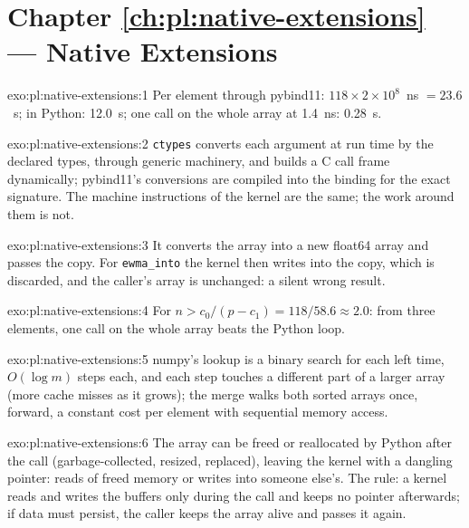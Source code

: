 \section*{Chapter \ref{ch:pl:native-extensions} --- Native Extensions}

\begin{solution}{exo:pl:native-extensions:1}
Per element through pybind11: $118 \times 2\times10^8$~ns $= 23.6$~s; in Python: 12.0~s; one call on the whole array at 1.4~ns: 0.28~s.
\end{solution}

\begin{solution}{exo:pl:native-extensions:2}
\texttt{ctypes} converts each argument at run time by the declared types, through generic machinery, and builds a C call frame
dynamically; pybind11's conversions are compiled into the binding for the exact signature. The machine instructions of the kernel are the
same; the work around them is not.
\end{solution}

\begin{solution}{exo:pl:native-extensions:3}
It converts the array into a new float64 array and passes the copy. For \texttt{ewma\_into} the kernel then writes into the copy, which is
discarded, and the caller's array is unchanged: a silent wrong result.
\end{solution}

\begin{solution}{exo:pl:native-extensions:4}
For $n > c_0/(p - c_1) = 118/58.6 \approx 2.0$: from three elements, one call on the whole array beats the Python loop.
\end{solution}

\begin{solution}{exo:pl:native-extensions:5}
numpy's lookup is a binary search for each left time, $O(\log m)$ steps each, and each step touches a different part of a larger array
(more cache misses as it grows); the merge walks both sorted arrays once, forward, a constant cost per element with sequential memory
access.
\end{solution}

\begin{solution}{exo:pl:native-extensions:6}
The array can be freed or reallocated by Python after the call (garbage-collected, resized, replaced), leaving the kernel with a dangling
pointer: reads of freed memory or writes into someone else's. The rule: a kernel reads and writes the buffers only during the call and keeps
no pointer afterwards; if data must persist, the caller keeps the array alive and passes it again.
\end{solution}


